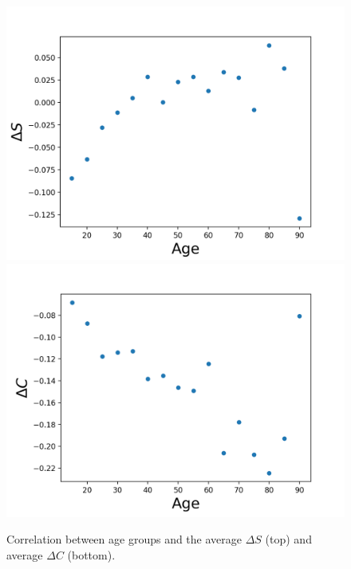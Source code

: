 \documentclass[article,twocolumn,preprint,10pt]{paper}%
\renewcommand{\(}{\left(}
\renewcommand{\)}{\right)}
\renewcommand{\[}{\left[}
\renewcommand{\]}{\right]}
\newcommand{\1}{\mbox{\boldmath$1$}}
\begin{document}
	\begin{figure}[h!]
		\includegraphics[width=1\linewidth]{dSVsAge}
		\includegraphics[width=1\linewidth]{dCvsAge}
		\caption{Correlation between age groups and the average $\Delta S$ (top) and average $\Delta C$ (bottom).}
		\label{fig:dSdCvsAge}
	\end{figure}
\end{document}
